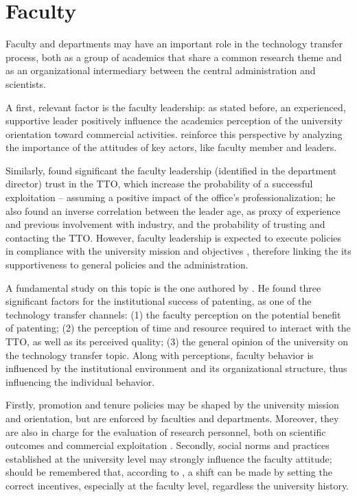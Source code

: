 \section{Faculty}

Faculty and departments may have an important role in the technology transfer process, both as a group of academics that share a common research theme and as an organizational intermediary between the central administration and scientists. 

A first, relevant factor is the faculty leadership: as stated before, an experienced, supportive leader positively influence the academics perception of the university orientation toward commercial activities. \citet{Guerrero2014} reinforce this perspective by analyzing the importance of the attitudes of key actors, like faculty member and leaders. 

Similarly, \citet{Muscio2010} found significant the faculty leadership (identified in the department director) trust in the TTO, which increase the probability of a successful exploitation – assuming a positive impact of the office's professionalization; he also found an inverse correlation between the leader age, as proxy of experience and previous involvement with industry, and the probability of trusting and contacting the TTO. However, faculty leadership is expected to execute policies in compliance with the university mission and objectives \citep{Chang2016}, therefore linking the its supportiveness to general policies and the administration. 

A fundamental study on this topic is the one authored by \citet{OwenSmith2001}. He found three significant factors for the institutional success of patenting, as one of the technology transfer channels: (1) the faculty perception on the potential benefit of patenting; (2) the perception of time and resource required to interact with the TTO, as well as its perceived quality; (3) the general opinion of the university on the technology transfer topic. Along with perceptions, faculty behavior is influenced by the institutional environment and its organizational structure, thus influencing the individual behavior. 

Firstly, promotion and tenure policies may be shaped by the university mission and orientation, but are enforced by faculties and departments. Moreover, they are also in charge for the evaluation of research personnel, both on scientific outcomes and commercial exploitation \citep{Chang2016}. Secondly, social norms and practices established at the university level may strongly influence the faculty attitude; should be remembered that, according to \citet{Bercovitz2006}, a shift can be made by setting the correct incentives, especially at the faculty level, regardless the university history.

